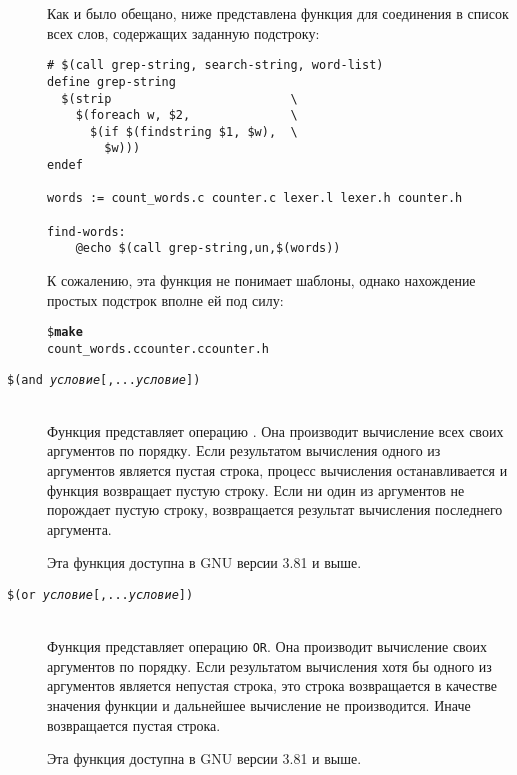 \begin{description}
Как и было обещано, ниже представлена функция для соединения в список
всех слов, содержащих заданную подстроку:

{\footnotesize
\begin{verbatim}
# $(call grep-string, search-string, word-list)
define grep-string
  $(strip                         \
    $(foreach w, $2,              \
      $(if $(findstring $1, $w),  \
        $w)))
endef

words := count_words.c counter.c lexer.l lexer.h counter.h

find-words:
    @echo $(call grep-string,un,$(words))
\end{verbatim}
}

К сожалению, эта функция не понимает шаблоны, однако нахождение
простых подстрок вполне ей под силу:

{\footnotesize
\begin{alltt}
\${} \textbf{make}
count\_words.c counter.c counter.h
\end{alltt}
}

\item[\texttt{\${}(and \emph{условие}\subi{1}[,...\emph{условие}\subi{n}])}] \hfill \\
Функция \function{and} представляет операцию \command{AND}. Она
производит вычисление всех своих аргументов по порядку. Если
результатом вычисления одного из аргументов является пустая строка,
процесс вычисления останавливается и функция возвращает пустую строку.
Если ни один из аргументов не порождает пустую строку, возвращается
результат вычисления последнего аргумента.

Эта функция доступна в GNU \GNUmake{}  версии 3.81 и выше.

\item[\texttt{\${}(or \emph{условие}\subi{1}[,...\emph{условие}\subi{n}])}] \hfill \\
Функция \function{or} представляет операцию \texttt{OR}. Она производит
вычисление своих аргументов по порядку. Если результатом вычисления
хотя бы одного из аргументов является непустая строка, это строка
возвращается в качестве значения функции и дальнейшее вычисление не
производится. Иначе возвращается пустая строка.

Эта функция доступна в GNU \GNUmake{}  версии 3.81 и выше.

\end{description}

